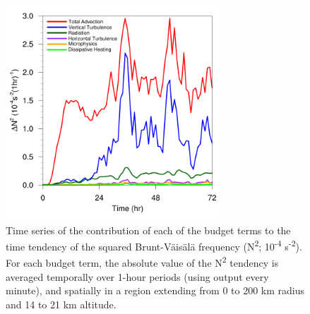 \documentclass{ametsoc}
\begin{document}
\begin{figure}[ht]
\centerline{\includegraphics[width=19pc]{figures/AVG_budterms.png}}
\caption{Time series of the contribution of each of the budget terms to the time tendency of the squared Brunt-V{\"a}is{\"a}l{\"a} frequency (N\textsuperscript{2}; 10\textsuperscript{-4} s\textsuperscript{-2}). For each budget term, the absolute value of the N\textsuperscript{2} tendency is averaged temporally over 1-hour periods (using output every minute), and spatially in a region extending from 0 to 200 km radius and 14 to 21 km altitude.}
\label{fig:avgbudterms}
\end{figure}
\end{document}
